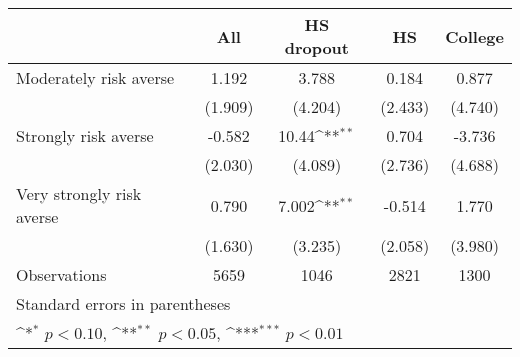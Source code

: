 {
\def\sym#1{\ifmmode^{#1}\else\(^{#1}\)\fi}
\begin{tabular}{l*{4}{c}}
\toprule
                    &\multicolumn{1}{c}{All}&\multicolumn{1}{c}{HS dropout}&\multicolumn{1}{c}{HS}&\multicolumn{1}{c}{College}\\
\midrule
Moderately risk averse&       1.192         &       3.788         &       0.184         &       0.877         \\
                    &     (1.909)         &     (4.204)         &     (2.433)         &     (4.740)         \\
\addlinespace
Strongly risk averse&      -0.582         &       10.44\sym{**} &       0.704         &      -3.736         \\
                    &     (2.030)         &     (4.089)         &     (2.736)         &     (4.688)         \\
\addlinespace
Very strongly risk averse&       0.790         &       7.002\sym{**} &      -0.514         &       1.770         \\
                    &     (1.630)         &     (3.235)         &     (2.058)         &     (3.980)         \\
\midrule
Observations        &        5659         &        1046         &        2821         &        1300         \\
\bottomrule
\multicolumn{5}{l}{\footnotesize Standard errors in parentheses}\\
\multicolumn{5}{l}{\footnotesize \sym{*} \(p<0.10\), \sym{**} \(p<0.05\), \sym{***} \(p<0.01\)}\\
\end{tabular}
}
